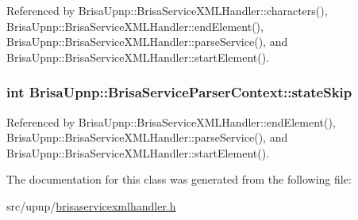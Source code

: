 Referenced by BrisaUpnp::BrisaServiceXMLHandler::characters(), BrisaUpnp::BrisaServiceXMLHandler::endElement(), BrisaUpnp::BrisaServiceXMLHandler::parseService(), and BrisaUpnp::BrisaServiceXMLHandler::startElement().\hypertarget{classBrisaUpnp_1_1BrisaServiceParserContext_a8984b0f15ccfd72eeaf72ce8219ea0b0}{
\subsubsection[{stateSkip}]{\setlength{\rightskip}{0pt plus 5cm}int {\bf BrisaUpnp::BrisaServiceParserContext::stateSkip}}}
\label{classBrisaUpnp_1_1BrisaServiceParserContext_a8984b0f15ccfd72eeaf72ce8219ea0b0}


Referenced by BrisaUpnp::BrisaServiceXMLHandler::endElement(), BrisaUpnp::BrisaServiceXMLHandler::parseService(), and BrisaUpnp::BrisaServiceXMLHandler::startElement().

The documentation for this class was generated from the following file:\begin{DoxyCompactItemize}
\item 
src/upnp/\hyperlink{brisaservicexmlhandler_8h}{brisaservicexmlhandler.h}\end{DoxyCompactItemize}

